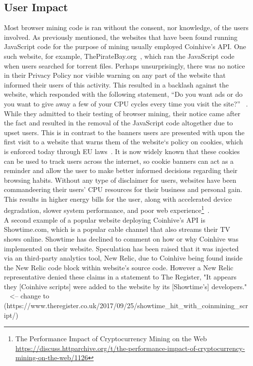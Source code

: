 \subsection{\textbf{User Impact}}
Most browser mining code is ran without the consent, nor knowledge, of the users involved. As previously mentioned, the websites that have been found running JavaScript code for the purpose of mining usually employed Coinhive's API. One such website, for example, ThePirateBay.org~\cite{bbcmintcrypto}, which ran the JavaScript code when users searched for torrent files. Perhaps unsurprisingly, there was no notice in their Privacy Policy nor visible warning on any part of the website that informed their users of this activity. This resulted in a backlash against the website, which responded with the following statement, ``Do you want ads or do you want to give away a few of your CPU cycles every time you visit the site?'' ~\cite{piratesbayblog}. While they admitted to their testing of browser mining, their notice came after the fact and resulted in the removal of the JavaScript code altogether due to upset users. This is in contrast to the banners users are presented with upon the first visit to a website that warns them of the website`s policy on cookies, which is enforced today through EU laws~\cite{eucookie}. It is now widely known that these cookies can be used to track users across the internet, so cookie banners can act as a reminder and allow the user to make better informed decisions regarding their browsing habits. Without any type of disclaimer for users, websites have been commandeering their users' CPU resources for their business and personal gain. This results in higher energy bills for the user, along with accelerated device degradation, slower system performance, and poor web experience\footnote{The Performance Impact of Cryptocurrency Mining on the Web \url{https://discuss.httparchive.org/t/the-performance-impact-of-cryptocurrency-mining-on-the-web/1126}}~\cite{gaurdianelectricity}.
\\
A second example of a popular website deploying Coinhive’s API is Showtime.com, which is a popular cable channel that also streams their TV shows online. Showtime has declined to comment on how or why Coinhive was implemented on their website. Speculation has been raised that it was injected via an third-party analytics tool, New Relic, due to Coinhive being found inside the New Relic code block within website's source code. However a New Relic representative denied these claims in a statement to The Register, "It appears they [Coinhive scripts] were added to the website by its [Showtime's] developers." ~\cite{gaurdianelectricity} <-- change to (https://www.theregister.co.uk/2017/09/25/showtime_hit_with_coinmining_script/)

